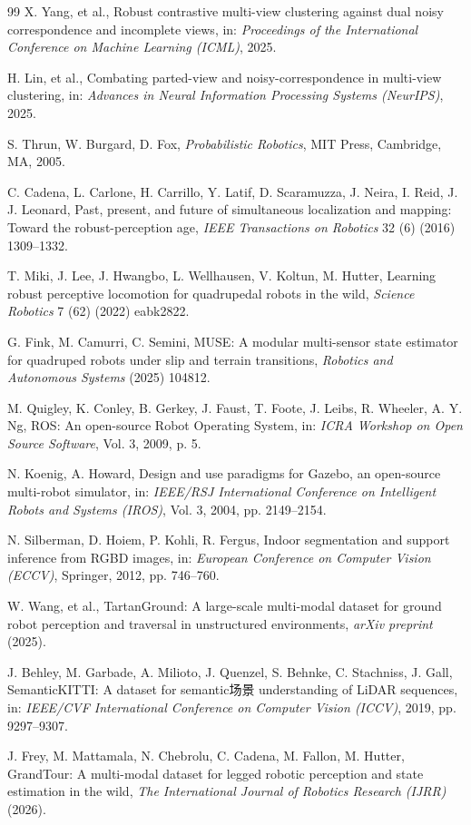 \documentclass[11pt, a4paper]{article}
\begin{document}
\begin{thebibliography}{99}
X. Yang, et al., Robust contrastive multi-view clustering against dual noisy correspondence and incomplete views, in: \textit{Proceedings of the International Conference on Machine Learning (ICML)}, 2025.

H. Lin, et al., Combating parted-view and noisy-correspondence in multi-view clustering, in: \textit{Advances in Neural Information Processing Systems (NeurIPS)}, 2025.

S. Thrun, W. Burgard, D. Fox, \textit{Probabilistic Robotics}, MIT Press, Cambridge, MA, 2005.

C. Cadena, L. Carlone, H. Carrillo, Y. Latif, D. Scaramuzza, J. Neira, I. Reid, J. J. Leonard, Past, present, and future of simultaneous localization and mapping: Toward the robust-perception age, \textit{IEEE Transactions on Robotics} 32 (6) (2016) 1309--1332.

T. Miki, J. Lee, J. Hwangbo, L. Wellhausen, V. Koltun, M. Hutter, Learning robust perceptive locomotion for quadrupedal robots in the wild, \textit{Science Robotics} 7 (62) (2022) eabk2822.

G. Fink, M. Camurri, C. Semini, MUSE: A modular multi-sensor state estimator for quadruped robots under slip and terrain transitions, \textit{Robotics and Autonomous Systems} (2025) 104812.

M. Quigley, K. Conley, B. Gerkey, J. Faust, T. Foote, J. Leibs, R. Wheeler, A. Y. Ng, ROS: An open-source Robot Operating System, in: \textit{ICRA Workshop on Open Source Software}, Vol. 3, 2009, p. 5.

N. Koenig, A. Howard, Design and use paradigms for Gazebo, an open-source multi-robot simulator, in: \textit{IEEE/RSJ International Conference on Intelligent Robots and Systems (IROS)}, Vol. 3, 2004, pp. 2149--2154.

N. Silberman, D. Hoiem, P. Kohli, R. Fergus, Indoor segmentation and support inference from RGBD images, in: \textit{European Conference on Computer Vision (ECCV)}, Springer, 2012, pp. 746--760.

W. Wang, et al., TartanGround: A large-scale multi-modal dataset for ground robot perception and traversal in unstructured environments, \textit{arXiv preprint} (2025).

J. Behley, M. Garbade, A. Milioto, J. Quenzel, S. Behnke, C. Stachniss, J. Gall, SemanticKITTI: A dataset for semantic场景 understanding of LiDAR sequences, in: \textit{IEEE/CVF International Conference on Computer Vision (ICCV)}, 2019, pp. 9297--9307.

J. Frey, M. Mattamala, N. Chebrolu, C. Cadena, M. Fallon, M. Hutter, GrandTour: A multi-modal dataset for legged robotic perception and state estimation in the wild, \textit{The International Journal of Robotics Research (IJRR)} (2026).

\end{thebibliography}
\end{document}
